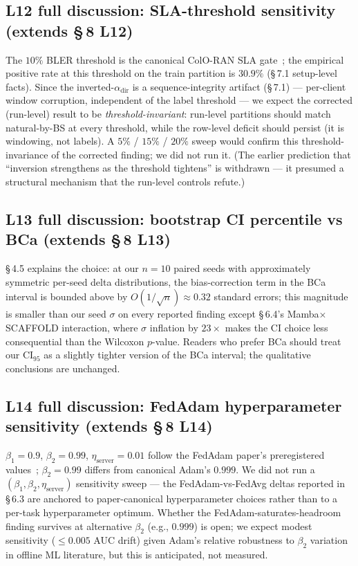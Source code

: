 \documentclass[journal]{IEEEtran}
\newcommand{\alphadir}{\ensuremath{\alpha_{\mathrm{dir}}}}
\begin{document}
\subsection{L12 full discussion: SLA-threshold sensitivity (extends \S\,8 L12)}

The $10\%$ BLER threshold is the canonical ColO-RAN SLA gate~\cite{Polese2022}; the empirical positive rate at this threshold on the train partition is $30.9\%$ (\S\,7.1 setup-level facts). Since the inverted-$\alphadir$ is a sequence-integrity artifact (\S\,7.1) --- per-client window corruption, independent of the label threshold --- we expect the corrected (run-level) result to be \emph{threshold-invariant}: run-level partitions should match natural-by-BS at every threshold, while the row-level deficit should persist (it is windowing, not labels). A $5\%$ / $15\%$ / $20\%$ sweep would confirm this threshold-invariance of the corrected finding; we did not run it. (The earlier prediction that ``inversion strengthens as the threshold tightens'' is withdrawn --- it presumed a structural mechanism that the run-level controls refute.)

\subsection{L13 full discussion: bootstrap CI percentile vs BCa (extends \S\,8 L13)}

\S\,4.5 explains the choice: at our $n = 10$ paired seeds with approximately symmetric per-seed delta distributions, the bias-correction term in the BCa interval is bounded above by $O(1/\sqrt{n}) \approx 0.32$ standard errors; this magnitude is smaller than our seed $\sigma$ on every reported finding except \S\,6.4's Mamba$\times$SCAFFOLD interaction, where $\sigma$ inflation by $23\times$ makes the CI choice less consequential than the Wilcoxon $p$-value. Readers who prefer BCa should treat our CI$_{95}$ as a slightly tighter version of the BCa interval; the qualitative conclusions are unchanged.

\subsection{L14 full discussion: FedAdam hyperparameter sensitivity (extends \S\,8 L14)}

$\beta_1 = 0.9$, $\beta_2 = 0.99$, $\eta_{\mathrm{server}} = 0.01$ follow the FedAdam paper's preregistered values~\cite{Reddi2021_FedAdam}; $\beta_2 = 0.99$ differs from canonical Adam's $0.999$. We did not run a $(\beta_1, \beta_2, \eta_{\mathrm{server}})$ sensitivity sweep --- the FedAdam-vs-FedAvg deltas reported in \S\,6.3 are anchored to paper-canonical hyperparameter choices rather than to a per-task hyperparameter optimum. Whether the FedAdam-saturates-headroom finding survives at alternative $\beta_2$ (e.g., $0.999$) is open; we expect modest sensitivity ($\leq 0.005$ AUC drift) given Adam's relative robustness to $\beta_2$ variation in offline ML literature, but this is anticipated, not measured.
\end{document}
